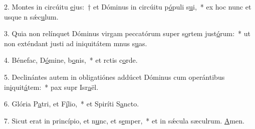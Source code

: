 2. Montes in circúitu \uline{e}jus:~† et Dóminus in circúitu p\uline{ó}puli s\uline{u}i,~* ex hoc nunc et usque n sǽc\uline{u}lum.\par 
3. Quia non relínquet Dóminus virgam peccatórum super s\uline{o}rtem just\uline{ó}rum:~* ut non exténdant justi ad iniquitátem mnus s\uline{u}as.\par 
4. Bénefac, D\uline{ó}mine, b\uline{o}nis,~* et rctis c\uline{o}rde.\par 
5. Declinántes autem in obligatiónes addúcet Dóminus cum operántibus in\uline{i}quit\uline{á}tem:~* pax supr Isr\uline{a}ël.\par 
6. Glória P\uline{a}tri, et F\uline{í}lio,~* et Spiríti S\uline{a}ncto.\par 
7. Sicut erat in princípio, et n\uline{u}nc, et s\uline{e}mper,~* et in sǽcula sæculrum. \uline{A}men.\par 
